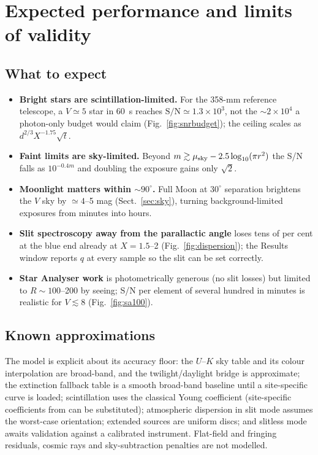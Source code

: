 \section{Expected performance and limits of validity}
\label{sec:expectations}

\subsection{What to expect}

\begin{itemize}
\item \textbf{Bright stars are scintillation-limited.} For the 358-mm
  reference telescope, a $V\simeq5$ star in \SI{60}{s} reaches
  $\mathrm{S/N}\simeq1.3\times10^{3}$, not the $\sim2\times10^{4}$ a
  photon-only budget would claim (Fig.~\ref{fig:snrbudget}); the ceiling
  scales as $d^{2/3} X^{-1.75} \sqrt{t}$.
\item \textbf{Faint limits are sky-limited.} Beyond
  $m \gtrsim \mu_{\rm sky} - 2.5\log_{10}(\pi r^2)$ the S/N falls as
  $10^{-0.4m}$ and doubling the exposure gains only $\sqrt{2}$.
\item \textbf{Moonlight matters within $\sim90^\circ$.} Full Moon at
  $30^\circ$ separation brightens the $V$ sky by $\simeq4$--5 mag
  (Sect.~\ref{sec:sky}), turning background-limited exposures from minutes
  into hours.
\item \textbf{Slit spectroscopy away from the parallactic angle} loses tens
  of per cent at the blue end already at $X = 1.5$--2
  (Fig.~\ref{fig:dispersion}); the Results window reports $q$ at every
  sample so the slit can be set correctly.
\item \textbf{Star Analyser work} is photometrically generous (no slit
  losses) but limited to $R\sim100$--200 by seeing; S/N per element of
  several hundred in minutes is realistic for $V \lesssim 8$
  (Fig.~\ref{fig:sa100}).
\end{itemize}

\subsection{Known approximations}

The model is explicit about its accuracy floor: the $U$--$K$ sky table and
its colour interpolation are broad-band, and the twilight/daylight bridge is
approximate; the extinction fallback table is a smooth broad-band baseline
until a site-specific curve is loaded; scintillation uses the classical
Young coefficient (site-specific coefficients from \citealt{osborn2015} can
be substituted); atmospheric dispersion in slit mode assumes the worst-case
orientation; extended sources are uniform discs; and slitless mode awaits
validation against a calibrated instrument. Flat-field and fringing
residuals, cosmic rays and sky-subtraction penalties are not modelled.

